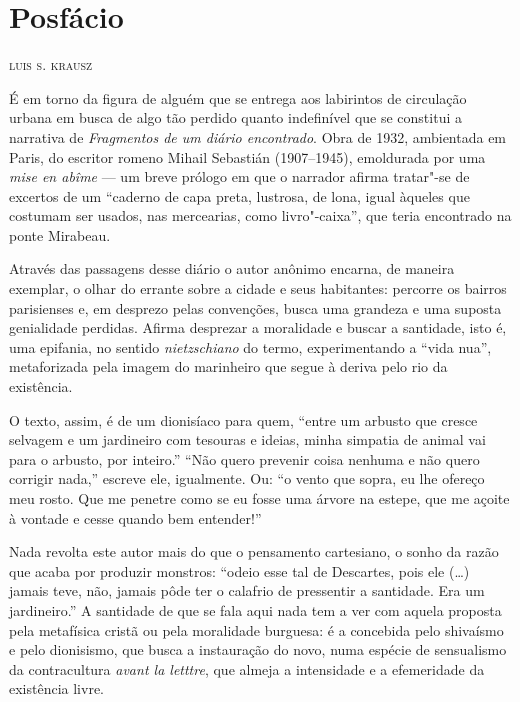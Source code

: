 
\small
\chapter*{Posfácio}

\hfill\textsc{luis s. krausz}

\bigskip

É em torno da figura de alguém que se entrega aos labirintos de
circulação urbana em busca de algo tão perdido quanto indefinível que se
constitui a narrativa de \emph{Fragmentos de um diário encontrado}. Obra
de 1932, ambientada em Paris, do escritor romeno Mihail Sebastián
(1907--1945), emoldurada por uma \emph{mise en abîme} --- um breve prólogo
em que o narrador afirma tratar"-se de excertos de um ``caderno de capa
preta, lustrosa, de lona, igual àqueles que costumam ser usados, nas mercearias, como livro"-caixa'', que teria encontrado na ponte Mirabeau.

Através das passagens desse diário o
autor anônimo encarna, de maneira exemplar, o olhar do errante sobre a
cidade e seus habitantes: percorre os bairros parisienses e, em desprezo
pelas convenções, busca uma grandeza e uma suposta genialidade perdidas.
Afirma desprezar a moralidade e buscar a santidade, isto é,
uma epifania, no sentido \emph{nietzschiano} do termo, experimentando
a ``vida nua'', metaforizada pela imagem do marinheiro que segue à deriva
pelo rio da existência.

O texto, assim, é de um dionisíaco para quem, ``entre um arbusto que
cresce selvagem e um jardineiro com tesouras e ideias, minha simpatia de
animal vai para o arbusto, por inteiro.'' ``Não quero prevenir coisa
nenhuma e não quero corrigir nada,'' escreve ele, igualmente. Ou: ``o
vento que sopra, eu lhe ofereço meu rosto. Que me penetre como se eu
fosse uma árvore na estepe, que me açoite à vontade e cesse quando bem
entender!''

Nada revolta este autor mais do que o pensamento cartesiano, o sonho da
razão que acaba por produzir monstros: ``odeio esse tal de Descartes,
pois ele (\ldots{}) jamais teve, não, jamais pôde ter o calafrio de
pressentir a santidade. Era um jardineiro.'' A santidade de que se fala
aqui nada tem a ver com aquela proposta pela metafísica cristã ou pela
moralidade burguesa: é a concebida pelo shivaísmo e pelo dionisismo, que
busca a instauração do novo, numa espécie de sensualismo da
contracultura \emph{avant la letttre}, que almeja a intensidade e a
efemeridade da existência livre.

